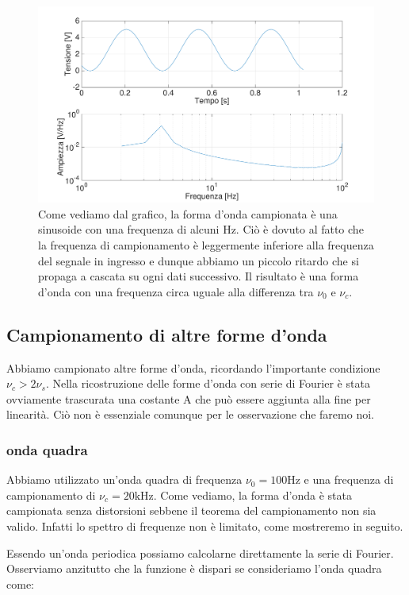 \begin{figure}[H]
\centering
	\includegraphics[width=.73\textwidth]{../E13/latex/sin100hz@100,97.pdf}
	\caption{Come vediamo dal grafico, la forma d'onda campionata è una sinusoide con una frequenza di alcuni Hz. Ciò è dovuto al fatto che la frequenza di campionamento è leggermente inferiore alla frequenza del segnale in ingresso e dunque abbiamo un piccolo ritardo che si propaga a cascata su ogni dati successivo. Il risultato è una forma d'onda con una frequenza circa uguale alla differenza tra $\nu_0$ e $\nu_c$.}
	\label{sin3}
\end{figure}



\subsection{Campionamento di altre forme d'onda}
Abbiamo campionato altre forme d'onda, ricordando l'importante condizione $\nu_c>2\nu_s$. Nella ricostruzione delle forme d'onda con serie di Fourier è stata ovviamente trascurata una costante A che può essere aggiunta alla fine per linearità. Ciò non è essenziale comunque per le osservazione che faremo noi.


\subsubsection{onda quadra}
Abbiamo utilizzato un'onda quadra di frequenza $\nu_0=100 \si{\hertz}$ e una frequenza di campionamento di $\nu_c=20\si{\kilo\hertz}$. Come vediamo, la forma d'onda è stata campionata senza distorsioni sebbene il teorema del campionamento non sia valido. Infatti lo spettro di frequenze non è limitato, come mostreremo in seguito.

Essendo un'onda periodica possiamo calcolarne direttamente la serie di Fourier. Osserviamo anzitutto che la funzione è dispari se consideriamo l'onda quadra come: 

